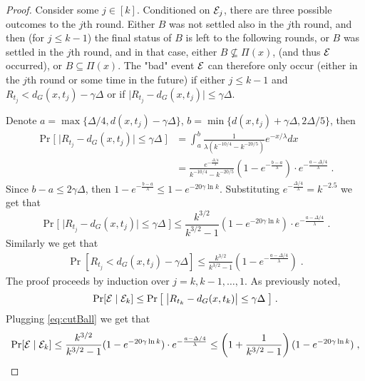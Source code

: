 \documentclass[11pt,fleqn]{article}
\begin{document}
\begin{proof}
Consider some $j \in [k]$. Conditioned on ${\cal E}_j$, there are three possible outcomes to the $j$th round. Either $B$ was not settled also in the $j$th round, and then (for $j \le k-1$) the final status of $B$ is left to the following rounds, or $B$ was settled in the $j$th round, and in that case, either $B \not\subseteq \Pi(x)$, (and thus ${\cal E}$ occurred), or $B \subseteq \Pi(x)$.
The "bad" event ${\cal E}$ can therefore only occur (either in the $j$th round or some time in the future) if either $j \le k-1$ and $R_{t_j} < d_G(x,t_j)- \gamma \Delta$ or if $\big| R_{t_j} - d_G(x,t_j) \big| \le \gamma \Delta$.

Denote $a = \max\{\Delta/4, d(x,t_j) - \gamma \Delta\}$, $b = \min\{d(x,t_j) + \gamma \Delta ,2\Delta/5 \}$, then 
\begin{equation*}
\begin{split}
\Pr\big[\; \big| R_{t_j} - d_G(x,t_j) \big| \le \gamma \Delta \; \big] &= \int_{a}^{b}{\frac{1}{\lambda(k^{-10/4} - k^{-20/5})}e^{- x/ \lambda}dx}\\
&= \frac{e^{- \frac{\Delta/4}{\lambda}}}{k^{-10/4} - k^{-20/5}} (1-e^{- \frac{b-a}{\lambda} }) \cdot e^{- \frac{a- \Delta/4}{\lambda}} \; .
\end{split}
\end{equation*}
Since $b-a \le 2 \gamma \Delta$, then $1-e^{- \frac{b-a}{\lambda}} \le 1-e^{- 20 \gamma \ln k}$. Substituting $e^{- \frac{\Delta/4}{\lambda}} = k^{-2.5}$ we get that 
\begin{equation}
\Pr\big[\; \big| R_{t_j} - d_G(x,t_j) \big| \le \gamma \Delta\; \big] \le \frac{k^{3/2}}{k^{3/2}-1} (1-e^{- 20 \gamma \ln k}) \cdot e^{- \frac{a- \Delta/4}{\lambda}}\;.
\label{eq:cutBall}
\end{equation}
Similarly we get that 
\begin{equation}
\begin{split}
\Pr[R_{t_j} < d_G(x,t_j)- \gamma \Delta] \le \frac{k^{3/2}}{k^{3/2} - 1} ( 1 - e^{- \frac{a- \Delta/4}{\lambda}}) \;.
\end{split}
\label{eq:notSettle}
\end{equation}
The proof proceeds by induction over $j= k, k-1,\ldots,1$.
As previously noted, $$\Pr[{\cal E} \mid {\cal E}_k] \le \Pr\big[\; \big| R_{t_k} - d_G(x,t_k) \big| \le \gamma \Delta\; \big] \;.$$ Plugging \eqref{eq:cutBall} we get that
\begin{equation*}
\Pr[{\cal E} \mid {\cal E}_k] \le \frac{k^{3/2}}{k^{3/2}-1} (1-e^{- 20 \gamma \ln k}) \cdot e^{- \frac{a- \Delta/4}{\lambda}} \le \left( 1 + \frac{1}{k^{3/2}-1}\right) (1-e^{- 20 \gamma \ln k}) \;,

\end{equation*}
\end{proof}
\end{document}
